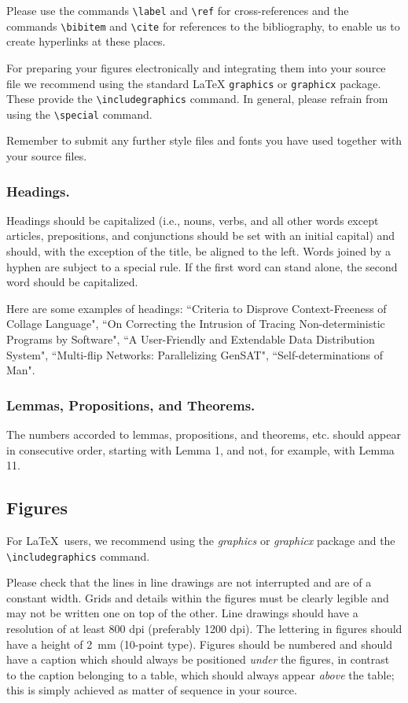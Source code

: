 \documentclass[runningheads,a4paper]{llncs}
\begin{document}
Please use the commands \verb+\label+ and \verb+\ref+ for
cross-references and the commands \verb+\bibitem+ and \verb+\cite+ for
references to the bibliography, to enable us to create hyperlinks at
these places.

For preparing your figures electronically and integrating them into
your source file we recommend using the standard \LaTeX{} \verb+graphics+ or
\verb+graphicx+ package. These provide the \verb+\includegraphics+ command.
In general, please refrain from using the \verb+\special+ command.

Remember to submit any further style files and
fonts you have used together with your source files.

\subsubsection{Headings.}

Headings should be capitalized
(i.e., nouns, verbs, and all other words
except articles, prepositions, and conjunctions should be set with an
initial capital) and should,
with the exception of the title, be aligned to the left.
Words joined by a hyphen are subject to a special rule. If the first
word can stand alone, the second word should be capitalized.

Here are some examples of headings: ``Criteria to Disprove
Context-Freeness of Collage Language", ``On Correcting the Intrusion of
Tracing Non-deterministic Programs by Software", ``A User-Friendly and
Extendable Data Distribution System", ``Multi-flip Networks:
Parallelizing GenSAT", ``Self-determinations of Man".

\subsubsection{Lemmas, Propositions, and Theorems.}

The numbers accorded to lemmas, propositions, and theorems, etc. should
appear in consecutive order, starting with Lemma 1, and not, for
example, with Lemma 11.

\subsection{Figures}

For \LaTeX\ users, we recommend using the \emph{graphics} or \emph{graphicx}
package and the \verb+\includegraphics+ command.

Please check that the lines in line drawings are not
interrupted and are of a constant width. Grids and details within the
figures must be clearly legible and may not be written one on top of
the other. Line drawings should have a resolution of at least 800 dpi
(preferably 1200 dpi). The lettering in figures should have a height of
2~mm (10-point type). Figures should be numbered and should have a
caption which should always be positioned \emph{under} the figures, in
contrast to the caption belonging to a table, which should always appear
\emph{above} the table; this is simply achieved as matter of sequence in
your source.
\end{document}
